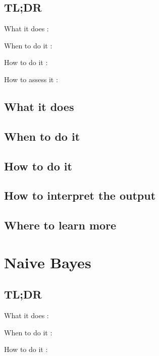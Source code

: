 \documentclass[
]{book}
\begin{document}
\hypertarget{tldr-5}{%
\section{TL;DR}\label{tldr-5}}

What it does
:

When to do it
:

How to do it
:

How to assess it
:

\hypertarget{what-it-does-5}{%
\section{What it does}\label{what-it-does-5}}

\hypertarget{when-to-do-it-5}{%
\section{When to do it}\label{when-to-do-it-5}}

\hypertarget{how-to-do-it-5}{%
\section{How to do it}\label{how-to-do-it-5}}

\hypertarget{how-to-interpret-the-output-5}{%
\section{How to interpret the output}\label{how-to-interpret-the-output-5}}

\hypertarget{where-to-learn-more-5}{%
\section{Where to learn more}\label{where-to-learn-more-5}}

\hypertarget{naive-bayes}{%
\chapter{Naive Bayes}\label{naive-bayes}}

\hypertarget{tldr-6}{%
\section{TL;DR}\label{tldr-6}}

What it does
:

When to do it
:

How to do it
:
\end{document}
